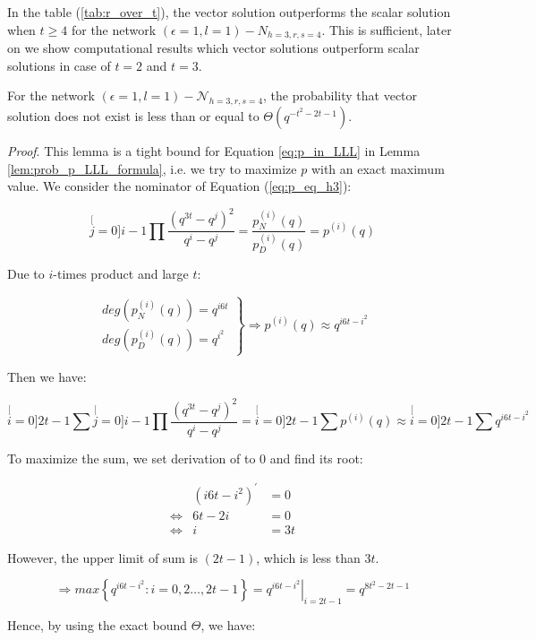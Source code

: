 In the table (\ref{tab:r_over_t}), the vector solution outperforms
the scalar solution when $t\geq4$ for the network $\left(\epsilon=1,l=1\right)-\ensuremath{N}_{h=3,r,s=4}$.
This is sufficient, later on we show computational results which vector
solutions outperform scalar solutions in case of $t=2$ and $t=3$.
\begin{lem}
For the network $\left(\epsilon=1,l=1\right)-\mathcal{N}_{h=3,r,s=4}$,
the probability that vector solution does not exist is less than or
equal to $\Theta\left(q^{-t^{2}-2t-1}\right)$. \label{lem:tight_bound_p}
\end{lem}
\textit{Proof}. This lemma is a tight bound for Equation \ref{eq:p_in_LLL}
in Lemma \ref{lem:prob_p_LLL_formula}, i.e. we try to maximize $p$
with an exact maximum value. We consider the nominator of Equation
(\ref{eq:p_eq_h3}):

\[
\stackrel[j=0]{i-1}{\mathop{\prod}}\frac{\left(q^{3t}-q^{j}\right)^{2}}{q^{i}-q^{j}}=\frac{p_{N}^{(i)}(q)}{p_{D}^{(i)}(q)}=p^{(i)}(q)
\]

Due to $i$-times product and large $t$:

\[
\left.\begin{array}{c}
deg\left(p_{N}^{(i)}(q)\right)=q^{i6t}\\
deg\left(p_{D}^{(i)}(q)\right)=q^{i^{2}}
\end{array}\right\} \Rightarrow p^{(i)}(q)\approx q^{i6t-i^{2}}
\]

Then we have:

\[
\stackrel[i=0]{2t-1}{\mathop{\sum}}\stackrel[j=0]{i-1}{\mathop{\prod}}\frac{\left(q^{3t}-q^{j}\right)^{2}}{q^{i}-q^{j}}=\stackrel[i=0]{2t-1}{\mathop{\sum}}p^{(i)}(q)\approx\stackrel[i=0]{2t-1}{\mathop{\sum}}q^{i6t-i^{2}}
\]

To maximize the sum, we set derivation of to 0 and find its root:

\begin{eqnarray*}
 & \left(i6t-i^{2}\right)^{'} & =0\\
\Leftrightarrow & 6t-2i & =0\\
\Leftrightarrow & i & =3t
\end{eqnarray*}

However, the upper limit of sum is $\left(2t-1\right)$, which is
less than $3t$.

\[
\Rightarrow max\left\{ q^{i6t-i^{2}}:i=0,2\ldots,2t-1\right\} =\left.q^{i6t-i^{2}}\right|_{i=2t-1}=q^{8t^{2}-2t-1}
\]

Hence, by using the exact bound $\Theta$, we have:

